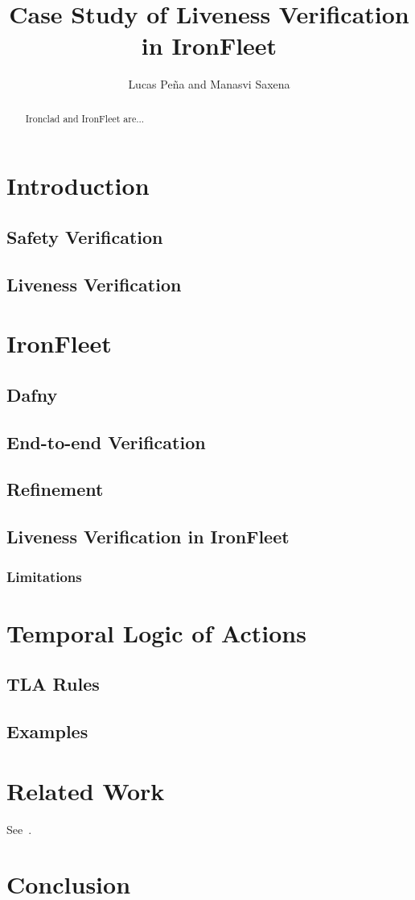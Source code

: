 \documentclass{llncs}
\begin{document}
%
\mainmatter              %
%
\title{Case Study of Liveness Verification in IronFleet}
%
\author{Lucas Pe\~{n}a and Manasvi Saxena}
%

\maketitle              %

\begin{abstract}
Ironclad \cite{ironclad} and IronFleet \cite{ironfleet} are...
\end{abstract}
%
\section{Introduction}
\subsection{Safety Verification}
\subsection{Liveness Verification}
%
\section{IronFleet}
\subsection{Dafny}
\subsection{End-to-end Verification}
\subsection{Refinement}
\subsection{Liveness Verification in IronFleet}
\subsubsection{Limitations}
%
\section{Temporal Logic of Actions}
\subsection{TLA Rules}
\subsection{Examples}
%
\section{Related Work}
See~\cite{other-liveness}.
%
\section{Conclusion}

%
%



\end{document}
